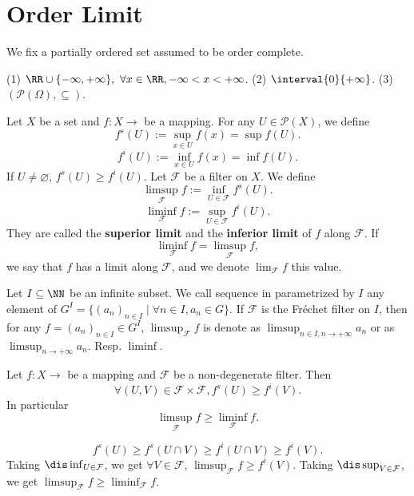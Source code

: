 \section{Order Limit}
We fix a partially ordered set  assumed to be order complete.
\begin{exampleenv}
    \quad
    \newline
    (1) $\RR\cup\{-\infty,+\infty\}, \ \forall x\in \RR, -\infty<x<+\infty$.
    \newline
    (2) $\interval{0}{+\infty}$.
    \newline
    (3) $\left(\mathscr{P}(\Omega),\subseteq\right)$.
\end{exampleenv}
\begin{definitionenv}
    Let $X$ be a set and $f:X\longrightarrow $  be a mapping. For any $U\in \mathscr{P}(X)$, we define 
    $$f^s(U):=\sup_{x\in U}f(x)=\sup f(U).$$
    $$f^i(U):=\inf_{x\in U}f(x)=\inf f(U).$$
    If $U\not=\varnothing$, $f^s(U)\ge f^i(U)$. Let $\mathcal{F}$ be a filter on $X$. We define 
    $$\limsup_\mathcal{F} f:=\inf_{U\in \mathcal{F}} f^s(U).$$
    $$\liminf_\mathcal{F} f:=\sup_{U\in \mathcal{F}} f^i(U).$$
    They are called the \textbf{superior limit} and the \textbf{inferior limit} of $f$ along $\mathcal{F}$. If 
    $$\liminf_\mathcal{F} f=\limsup_\mathcal{F} f,$$
    we say that $f$ has a limit along $\mathcal{F}$, and we denote $\displaystyle \lim_{\mathcal{F}}f$ this value.
\end{definitionenv}
\begin{notationenv}
    Let $I\subseteq \NN$ be an infinite subset. We call sequence in  parametrized by $I$ any element of $G^I=\{(a_n)_{n\in I}\mid \forall n\in I,a_n\in G\}$. If $\mathcal{F}$ is the Fréchet filter on $I$, then for any $f=(a_n)_{n\in I}\in G^I$, $\limsup_{\mathcal{F}}f$ is denote as $\displaystyle\limsup_{n\in I, n\rightarrow+\infty}a_n$ or as $\displaystyle\limsup_{n\rightarrow +\infty}a_n$. Resp. $\liminf$.
\end{notationenv}
\begin{propositionenv}
    Let $f:X\longrightarrow$  be a mapping and $\mathcal{F}$ be a non-degenerate filter. Then 
    $$\forall (U,V)\in \mathcal{F}\times\mathcal{F}, f^{s}(U)\ge f^i(V).$$
    In particular 
    $$\limsup_\mathcal{F}f\ge \liminf_\mathcal{F}f.$$
\end{propositionenv}
\begin{proofenv}
    $$f^s(U)\ge f^s(U\cap V)\ge f^i(U\cap V)\ge f^i(V).$$
    Taking $\dis\inf_{U\in \mathcal{F}}$, we get $\forall V\in \mathcal{F}$, $\limsup_{\mathcal{F}}f\ge f^i(V)$. Taking $\dis\sup_{V\in \mathcal{F}}$, we get $\limsup_{\mathcal{F}}f\ge \liminf_{\mathcal{F}}f$.
\end{proofenv}
